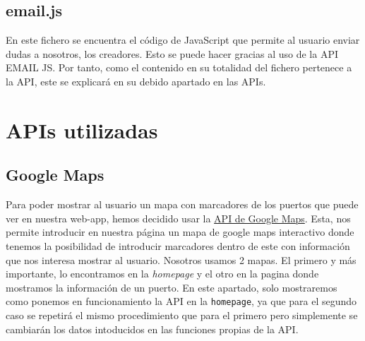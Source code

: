 \documentclass{article}
\begin{document}
\subsection{email.js}
En este fichero se encuentra el código de JavaScript que permite al usuario enviar dudas a nosotros, los creadores. Esto se puede hacer gracias al uso de la API EMAIL JS. Por tanto, como el contenido en su totalidad del fichero pertenece a la API, este se explicará en su debido apartado en las APIs.

\section{APIs utilizadas}
\subsection{Google Maps}
Para poder mostrar al usuario un mapa con marcadores de los puertos que puede ver en nuestra web-app, hemos decidido usar la \href{https://developers.google.com/maps?hl=es%2F%3Fq%3Dapis%20google}{API de Google Maps}. Esta, nos permite introducir en nuestra página un mapa de google maps interactivo donde tenemos la posibilidad de introducir marcadores dentro de este con información que nos interesa mostrar al usuario. Nosotros usamos 2 mapas. El primero y más importante, lo encontramos en la \textit{homepage} y el otro en la pagina donde mostramos la información de un puerto. En este apartado, solo mostraremos como ponemos en funcionamiento la API en la \texttt{homepage}, ya que para el segundo caso se repetirá el mismo procedimiento que para el primero pero simplemente se cambiarán los datos intoducidos en las funciones propias de la API.\\
\end{document}
